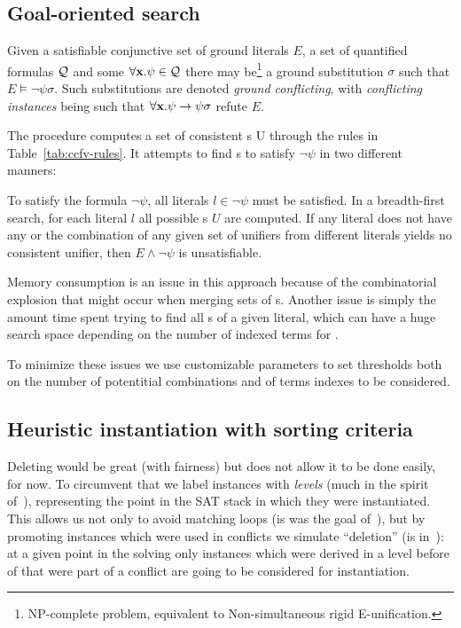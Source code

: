 \message{ !name(main.tex)}\documentclass{easychair}
\begin{document}
\subsection{Goal-oriented search}
\label{sec:inst-goal}

Given a satisfiable conjunctive set of ground literals $E$, a set
of quantified formulas $\mathcal{Q}$ and some $\qg{\forall, x, \psi}\in\Q$
there may be\footnote{NP-complete problem, equivalent to
  Non-simultaneous rigid E-unification.} a ground substitution
$\sigma$ such that $E\models\neg\psi\sigma$. Such substitutions are
denoted \emph{ground conflicting}, with \emph{conflicting instances}
being such that $\qg{\forall, x, \psi}\rightarrow\psi\sigma$ refute
$E$.


The {\ccfv} procedure computes a set of consistent {\eunif}s
\textsc{U} through the rules in Table~\ref{tab:ccfv-rules}. It
attempts to find {\eunif}s to satisfy $\neg\psi$ in two different manners:

To satisfy the formula $\neg\psi$, all literals $l\in\neg\psi$ must be
satisfied. In a breadth-first search, for each literal $l$ all
possible {\eunif}s $U$ are computed. If any literal does not have any
{\eunif} or the combination of any given set of unifiers from
different literals yields no consistent unifier, then
$E\wedge\neg\psi$ is unsatisfiable.

Memory consumption is an issue in this approach
because of the combinatorial explosion that might occur when merging
sets of {\eunif}s. Another issue is simply the amount time spent
trying to find all {\eunif}s of a given literal, which can have a huge
search space depending on the number of indexed terms for {\euni}.

To minimize these issues we use customizable parameters to set
thresholds both on the number of potentitial combinations and of terms
indexes to be considered.

\subsection{Heuristic instantiation with sorting criteria}
\label{sec:inst-heuristic-sorting}

Deleting would be great (with fairness) but {\verit} does not allow it
to be done easily, for now. To circumvent that we label instances with
\emph{levels} (much in the spirit of~\cite{Ge2007}), representing the
point in the SAT stack in which they were instantiated. This allows us
not only to avoid matching loops (is was the goal of~\cite{Ge2007}),
but by promoting instances which were used in conflicts we simulate
``deletion'' (is in~\cite{deMoura2007}): at a given point in the
solving only instances which were derived in a level before of that
were part of a conflict are going to be considered for instantiation.
\end{document}
